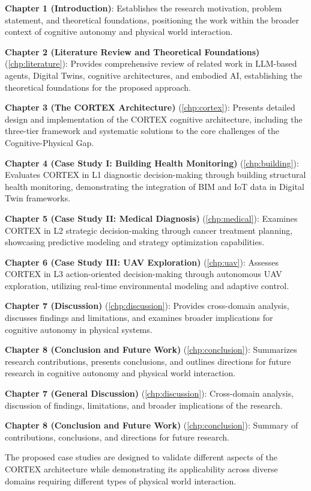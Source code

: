 \textbf{Chapter 1 (Introduction)}: Establishes the research motivation, problem statement, and theoretical foundations, positioning the work within the broader context of cognitive autonomy and physical world interaction.

\textbf{Chapter 2 (Literature Review and Theoretical Foundations)} (\autoref{chp:literature}): Provides comprehensive review of related work in LLM-based agents, Digital Twins, cognitive architectures, and embodied AI, establishing the theoretical foundations for the proposed approach.

\textbf{Chapter 3 (The CORTEX Architecture)} (\autoref{chp:cortex}): Presents detailed design and implementation of the CORTEX cognitive architecture, including the three-tier framework and systematic solutions to the core challenges of the Cognitive-Physical Gap.

\textbf{Chapter 4 (Case Study I: Building Health Monitoring)} (\autoref{chp:building}): Evaluates CORTEX in L1 diagnostic decision-making through building structural health monitoring, demonstrating the integration of BIM and IoT data in Digital Twin frameworks.

\textbf{Chapter 5 (Case Study II: Medical Diagnosis)} (\autoref{chp:medical}): Examines CORTEX in L2 strategic decision-making through cancer treatment planning, showcasing predictive modeling and strategy optimization capabilities.

\textbf{Chapter 6 (Case Study III: UAV Exploration)} (\autoref{chp:uav}): Assesses CORTEX in L3 action-oriented decision-making through autonomous UAV exploration, utilizing real-time environmental modeling and adaptive control.

\textbf{Chapter 7 (Discussion)} (\autoref{chp:discussion}): Provides cross-domain analysis, discusses findings and limitations, and examines broader implications for cognitive autonomy in physical systems.

\textbf{Chapter 8 (Conclusion and Future Work)} (\autoref{chp:conclusion}): Summarizes research contributions, presents conclusions, and outlines directions for future research in cognitive autonomy and physical world interaction.

\textbf{Chapter 7 (General Discussion)} (\autoref{chp:discussion}): Cross-domain analysis, discussion of findings, limitations, and broader implications of the research.

\textbf{Chapter 8 (Conclusion and Future Work)} (\autoref{chp:conclusion}): Summary of contributions, conclusions, and directions for future research.

The proposed case studies are designed to validate different aspects of the CORTEX architecture while demonstrating its applicability across diverse domains requiring different types of physical world interaction.
